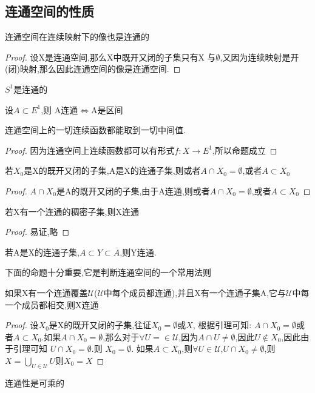 \subsection*{连通空间的性质}
\begin{corollary}
    连通空间在连续映射下的像也是连通的
\end{corollary}
\begin{proof}
    设X是连通空间,那么X中既开又闭的子集只有X 与\(\emptyset\),又因为连续映射是开(闭)映射,那么因此连通空间的像是连通空间.
\end{proof}
\begin{example}
    \(S^1\)是连通的
\end{example}
\begin{example}
    设\(A \subset E^1\),则 A连通\(\Leftrightarrow\)A是区间
\end{example}
\begin{corollary}
连通空间上的一切连续函数都能取到一切中间值.
\end{corollary}
\begin{proof}
    因为连通空间上连续函数都可以有形式\(f : X \rightarrow E^1\),所以命题成立
\end{proof}
\begin{lemma}
    若\(X_0\)是X的既开又闭的子集,A是X的连通子集,则或者\(A \cap X_0 = \emptyset\),或者\(A \subset X_0\)
\end{lemma}
\begin{proof}
    \(A \cap X_0\)是A的既开又闭的子集,由于A连通,则或者\(A \cap X_0 = \emptyset\),或者\(A \subset X_0\)
\end{proof}
\begin{corollary}
    若X有一个连通的稠密子集,则X连通
\end{corollary}
\begin{proof}
    易证,略
\end{proof}
\begin{corollary}
    若A是X的连通子集,\(A \subset Y \subset \overline{A}\),则Y连通.
\end{corollary}
下面的命题十分重要,它是判断连通空间的一个常用法则
\begin{corollary}
    如果X有一个连通覆盖\(\mathscr{U}\)(\(\mathscr{U}\)中每个成员都连通),并且X有一个连通子集A,它与\(\mathscr{U}\)中每一个成员都相交,则X连通
\end{corollary}
\begin{proof}
    设\(X_0\)是X的既开又闭的子集,往证\(X_0 = \emptyset \text{或} X \), 根据引理可知: \(A \cap X_0 = \emptyset \)或者\(A \subset X_0\).如果\(A \cap X_0 = \emptyset\),那么对于\(\forall U = \in  \mathscr{U}\),因为\(A \cap U \neq \emptyset\),因此\(U \notin X_0\),因此由于引理可知 \(U \cap X_0 = \emptyset\).则 \(X_0 = \emptyset\). 如果\(A \subset X_0\),则\(\forall U \in \mathscr{U}\),\(U \cap X_0 \neq \emptyset\),则\(X = \bigcup\limits_{U \in \mathscr{U}} U \)则\(X_0 =X \)
\end{proof}
\begin{theorem}
    连通性是可乘的
\end{theorem}
